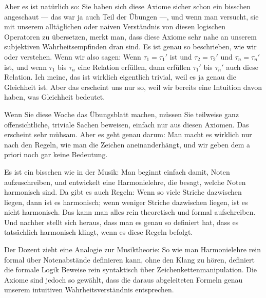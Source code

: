 \begin{spoken-clean}[00:06:26 - 00:08:40]
Aber es ist natürlich so: Sie haben sich diese Axiome sicher schon ein bisschen angeschaut --- das war ja auch Teil der Übungen ---, und wenn man versucht, sie mit unserem alltäglichen oder naiven Verständnis von diesen logischen Operatoren zu übersetzen, merkt man, dass diese Axiome sehr nahe an unserem subjektiven Wahrheitsempfinden dran sind. Es ist genau so beschrieben, wie wir  oder  verstehen. Wenn wir also sagen: Wenn $\tau_1 = \tau_1'$ ist und $\tau_2 = \tau_2'$ und $\tau_n = \tau_n'$ ist, und wenn $\tau_1$ bis $\tau_n$ eine Relation erfüllen, dann erfüllen $\tau_1'$ bis $\tau_n'$ auch diese Relation. Ich meine, das ist wirklich eigentlich trivial, weil es ja genau die Gleichheit ist. Aber das erscheint uns nur so, weil wir bereits eine Intuition davon haben, was Gleichheit bedeutet.

Wenn Sie diese Woche das Übungsblatt machen, müssen Sie teilweise ganz offensichtliche, triviale Sachen beweisen, einfach nur aus diesen Axiomen. Das erscheint sehr mühsam. Aber es geht genau darum: Man macht es wirklich nur nach den Regeln, wie man die Zeichen aneinanderhängt, und wir geben dem a priori noch gar keine Bedeutung. 

Es ist ein bisschen wie in der Musik: Man beginnt einfach damit, Noten aufzuschreiben, und entwickelt eine Harmonielehre, die besagt, welche Noten harmonisch sind. Da gibt es auch Regeln: Wenn so viele Striche dazwischen liegen, dann ist es harmonisch; wenn weniger Striche dazwischen liegen, ist es nicht harmonisch. Das kann man alles rein theoretisch und formal aufschreiben. Und nachher stellt sich heraus, dass man es genau so definiert hat, dass es tatsächlich harmonisch klingt, wenn es diese Regeln befolgt.
\end{spoken-clean}

\begin{didactic-insight}
Der Dozent zieht eine Analogie zur Musiktheorie: So wie man Harmonielehre rein formal über Notenabstände definieren kann, ohne den Klang zu hören, definiert die formale Logik Beweise rein syntaktisch über Zeichenkettenmanipulation. Die Axiome sind jedoch so gewählt, dass die daraus abgeleiteten  Formeln genau unserem intuitiven Wahrheitsverständnis entsprechen.
\end{didactic-insight}

